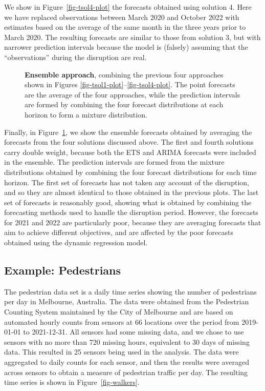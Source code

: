 \documentclass[
  11pt,
  a4paper,
]{article}
\makeatletter
\newcommand*\pandocbounded[1]{%
  \sbox\pandoc@box{#1}%
  \Gscale@div\@tempa{\textheight}{\dimexpr\ht\pandoc@box+\dp\pandoc@box\relax}%
  \Gscale@div\@tempb{\linewidth}{\wd\pandoc@box}%
  \ifdim\@tempb\p@<\@tempa\p@\let\@tempa\@tempb\fi%
  \ifdim\@tempa\p@<\p@\scalebox{\@tempa}{\usebox\pandoc@box}%
  \else\usebox{\pandoc@box}%
  \fi%
}
\makeatother
\begin{document}
We show in Figure~\ref{fig-tsol4-plot} the forecasts obtained using
solution 4. Here we have replaced observations between March 2020 and
October 2022 with estimates based on the average of the same month in
the three years prior to March 2020. The resulting forecasts are similar
to those from solution 3, but with narrower prediction intervals because
the model is (falsely) assuming that the ``observations'' during the
disruption are real.

\begin{figure}[!t]

\centering{

\pandocbounded{\texttt{[image: fits\_files/figure-pdf/fig-tensemble-plot-1.pdf]}}

}

\caption{\label{fig-tensemble-plot}\textbf{Ensemble approach}, combining
the previous four approaches shown in Figures
\ref{fig-tsol1-plot}--\ref{fig-tsol4-plot}. The point forecasts are the
average of the four approaches, while the prediction intervals are
formed by combining the four forecast distributions at each horizon to
form a mixture distribution.}

\end{figure}%

Finally, in Figure~\ref{fig-tensemble-plot}, we show the ensemble
forecasts obtained by averaging the forecasts from the four solutions
discussed above. The first and fourth solutions carry double weight,
because both the ETS and ARIMA forecasts were included in the ensemble.
The prediction intervals are formed from the mixture distributions
obtained by combining the four forecast distributions for each time
horizon. The first set of forecasts has not taken any account of the
disruption, and so they are almost identical to those obtained in the
previous plots. The last set of forecasts is reasonably good, showing
what is obtained by combining the forecasting methods used to handle the
disruption period. However, the forecasts for 2021 and 2022 are
particularly poor, because they are averaging forecasts that aim to
achieve different objectives, and are affected by the poor forecasts
obtained using the dynamic regression model.

\subsection{Example: Pedestrians}\label{example-pedestrians}

The pedestrian data set is a daily time series showing the number of
pedestrians per day in Melbourne, Australia. The data were obtained from
the Pedestrian Counting System maintained by the City of Melbourne
\autocite{pedestrians} and are based on automated hourly counts from
sensors at 66 locations over the period from 2019-01-01 to 2021-12-31.
All sensors had some missing data, and we chose to use sensors with no
more than 720 missing hours, equivalent to 30 days of missing data. This
resulted in 25 sensors being used in the analysis. The data were
aggregated to daily counts for each sensor, and then the results were
averaged across sensors to obtain a measure of pedestrian traffic per
day. The resulting time series is shown in Figure~\ref{fig-walkers}.
\end{document}
